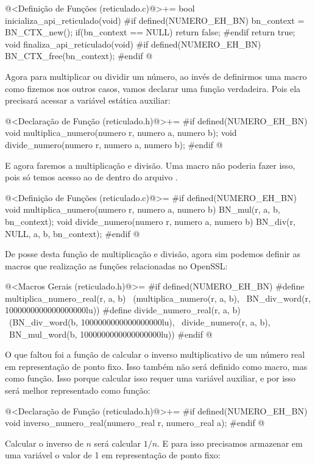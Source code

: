 \iniciocodigo
@<Definição de Funções (reticulado.c)@>+=
bool inicializa_api_reticulado(void){
#if defined(NUMERO_EH_BN)
  bn_context = BN_CTX_new();
  if(bn_context == NULL)
    return false;
#endif
  return true;
}
void finaliza_api_reticulado(void){
#if defined(NUMERO_EH_BN)
  BN_CTX_free(bn_context);
#endif
}
@
\fimcodigo

Agora para multiplicar ou dividir um número, ao invés de definirmos
uma macro como fizemos nos outros casos, vamos declarar uma função
verdadeira. Pois ela precisará acessar a variável estática auxiliar:

\iniciocodigo
@<Declaração de Função (reticulado.h)@>+=
#if defined(NUMERO_EH_BN)
void multiplica_numero(numero r, numero a, numero b);
void divide_numero(numero r, numero a, numero b);
#endif
@
\fimcodigo

E agora faremos a multiplicação e divisão. Uma macro não poderia fazer
isso, pois só temos acesso ao  de dentro do
arquivo .

\iniciocodigo
@<Definição de Funções (reticulado.c)@>=
#if defined(NUMERO_EH_BN)
void multiplica_numero(numero r, numero a, numero b){
  BN_mul(r, a, b, bn_context);
}
void divide_numero(numero r, numero a, numero b){
  BN_div(r, NULL, a, b, bn_context);
}
#endif
@

De posse desta função de multiplicação e divisão, agora sim podemos
definir as macros que realização as funções relacionadas no OpenSSL:

\iniciocodigo
@<Macros Gerais (reticulado.h)@>=
#if defined(NUMERO_EH_BN)
#define multiplica_numero_real(r, a, b)  \
        (multiplica_numero(r, a, b),    \
         BN_div_word(r, 1000000000000000000lu))
#define divide_numero_real(r, a, b)     \
        (BN_div_word(b, 1000000000000000000lu), \
         divide_numero(r, a, b),                \
         BN_mul_word(b, 1000000000000000000lu))
#endif
@
\fimcodigo

O que faltou foi a função de calcular o inverso multiplicativo de um
número real em representação de ponto fixo. Isso também não será
definido como macro, mas como função. Isso porque calcular isso requer
uma variável auxiliar, e por isso será melhor representado como
função:

\iniciocodigo
@<Declaração de Função (reticulado.h)@>+=
#if defined(NUMERO_EH_BN)
void inverso_numero_real(numero_real r, numero_real a);
#endif
@
\fimcodigo

Calcular o inverso de $n$ será calcular $1/n$. E para isso precisamos
armazenar em uma variável o valor de 1 em representação de ponto fixo:

